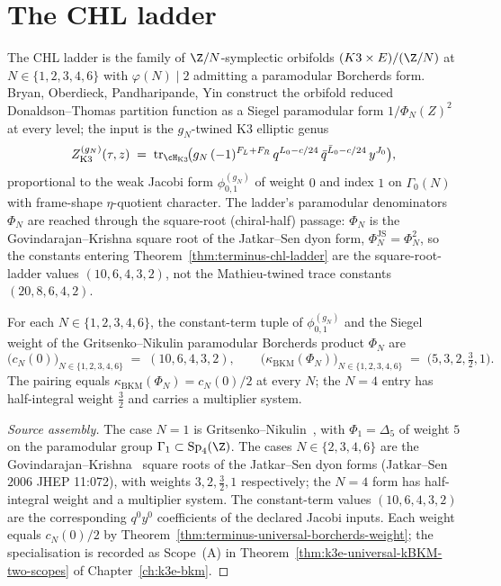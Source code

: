 \section{The CHL ladder}
\label{sec:terminus-chl-ladder}

The CHL ladder is the family of $\Z/N$-symplectic orbifolds
$(K3 \times E)/(\Z/N)$ at $N \in \{1, 2, 3, 4, 6\}$ with
$\varphi(N) \mid 2$ admitting a paramodular Borcherds form.
Bryan, Oberdieck, Pandharipande, Yin
\cite{BOPY2018} construct the orbifold reduced
Donaldson--Thomas partition function as a Siegel paramodular form
$1/\Phi_N(Z)^2$ at every level; the input is the $g_N$-twined K3
elliptic genus
\[
 Z^{(g_N)}_{\mathrm{K3}}(\tau, z) \;=\;
 \mathrm{tr}_{\cH_{\mathrm{K3}}}\!\bigl(g_N\,(-1)^{F_L + F_R}\,
 q^{L_0 - c/24}\,\bar q^{\bar L_0 - c/24}\,y^{J_0}\bigr),
\]
proportional to the weak Jacobi form $\phi_{0, 1}^{(g_N)}$ of
weight $0$ and index $1$ on $\Gamma_0(N)$ with frame-shape
$\eta$-quotient character.  The ladder's paramodular denominators
$\Phi_N$ are reached through the square-root (chiral-half) passage:
$\Phi_N$ is the Govindarajan--Krishna square root of the Jatkar--Sen
dyon form, $\Phi_N^{\mathrm{JS}} = \Phi_N^2$, so the constants
entering Theorem~\ref{thm:terminus-chl-ladder} are the
square-root-ladder values $(10, 6, 4, 3, 2)$, not the Mathieu-twined
trace constants $(20, 8, 6, 4, 2)$.

\begin{theorem}
\label{thm:terminus-chl-ladder}
For each $N \in \{1, 2, 3, 4, 6\}$, the constant-term tuple of
$\phi_{0, 1}^{(g_N)}$ and the Siegel weight of the Gritsenko--Nikulin
paramodular Borcherds product $\Phi_N$ are
\[
 \bigl(c_N(0)\bigr)_{N \in \{1, 2, 3, 4, 6\}} \;=\; (10, 6, 4, 3, 2),
 \qquad
 \bigl(\kappa_{\mathrm{BKM}}(\Phi_N)\bigr)_{N \in \{1, 2, 3, 4, 6\}}
 \;=\; \bigl(5, 3, 2, \tfrac32, 1\bigr).
\]
The pairing equals
$\kappa_{\mathrm{BKM}}(\Phi_N) = c_N(0)/2$ at every $N$; the $N = 4$
entry has half-integral weight $\tfrac32$ and carries a multiplier
system.
\end{theorem}

\begin{proof}[Source assembly]
The case $N = 1$ is Gritsenko--Nikulin~\cite[Part~II,
Theorem~2.1]{GritsenkoNikulin1995}, with $\Phi_1 = \Delta_5$ of weight
$5$ on the paramodular group $\Gamma_1 \subset \mathrm{Sp}_4(\Z)$.
The cases $N \in \{2, 3, 4, 6\}$ are the
Govindarajan--Krishna~\cite{GovindarajanKrishna2010} square roots of
the Jatkar--Sen dyon forms (Jatkar--Sen $2006$ JHEP 11:072), with weights
$3, 2, \tfrac32, 1$ respectively; the $N = 4$ form has half-integral
weight and a multiplier system.  The constant-term values
$(10, 6, 4, 3, 2)$ are the corresponding $q^0y^0$
coefficients of the declared Jacobi inputs.  Each weight equals
$c_N(0)/2$ by Theorem~\ref{thm:terminus-universal-borcherds-weight};
the specialisation is recorded as Scope~(A) in
Theorem~\ref{thm:k3e-universal-kBKM-two-scopes} of
Chapter~\ref{ch:k3e-bkm}.
\end{proof}

